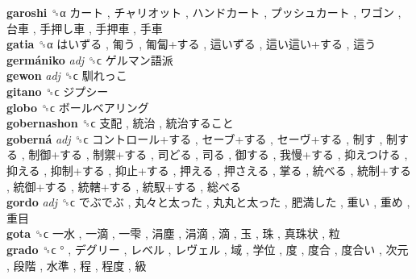 \textbf{garoshi} ␝α   カート ,  チャリオット ,  ハンドカート ,  プッシュカート ,  ワゴン ,  台車 ,  手押し車 ,  手押車 ,  手車   \\
\textbf{gatia} ␝α   はいずる ,  匍う ,  匍匐+する ,  這いずる ,  這い這い+する ,  這う   \\
\textbf{germániko} \emph{adj}  ␝ϲ   ゲルマン語派   \\
\textbf{gewon} \emph{adj}  ␝ϲ   馴れっこ   \\
\textbf{gitano} ␝ϲ   ジプシー   \\
\textbf{globo} ␝ϲ   ボールベアリング   \\
\textbf{gobernashon} ␝ϲ   支配 ,  統治 ,  統治すること   \\
\textbf{goberná} \emph{adj}  ␝ϲ   コントロール+する ,  セーブ+する ,  セーヴ+する ,  制す ,  制する ,  制御+する ,  制禦+する ,  司どる ,  司る ,  御する ,  我慢+する ,  抑えつける ,  抑える ,  抑制+する ,  抑止+する ,  押える ,  押さえる ,  掌る ,  統べる ,  統制+する ,  統御+する ,  統轄+する ,  統馭+する ,  総べる   \\
\textbf{gordo} \emph{adj}  ␝ϲ   でぶでぶ ,  丸々と太った ,  丸丸と太った ,  肥満した ,  重い ,  重め ,  重目   \\
\textbf{gota} ␝ϲ   一水 ,  一滴 ,  一雫 ,  涓塵 ,  涓滴 ,  滴 ,  玉 ,  珠 ,  真珠状 ,  粒   \\
\textbf{grado} ␝ϲ   ° ,  デグリー ,  レベル ,  レヴェル ,  域 ,  学位 ,  度 ,  度合 ,  度合い ,  次元 ,  段階 ,  水準 ,  程 ,  程度 ,  級   \\
